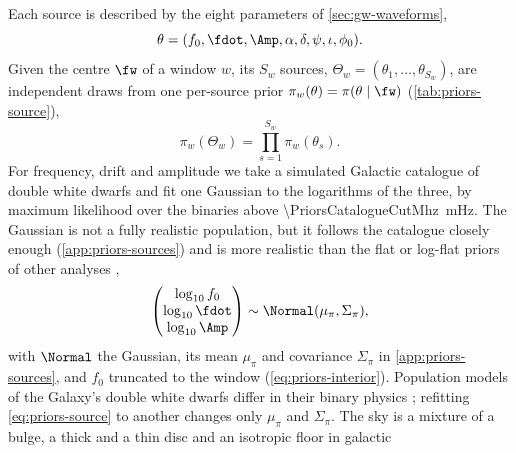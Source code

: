 Each source is described by the eight parameters of \cref{sec:gw-waveforms},
\begin{equation}
  \theta = (f_0,\fdot,\Amp,\alpha,\delta,\psi,\iota,\phi_0).
  \label{eq:gw-parameters}
\end{equation}
Given the centre $\fw$ of a window $w$, its $S_w$ sources, $\Theta_w = (\theta_1,\dots,\theta_{S_w})$,
are independent draws from one per-source prior $\pi_w(\theta) = \pi(\theta\mid\fw)$
(\cref{tab:priors-source}),
\begin{equation}
  \pi_w(\Theta_w) = \prod_{s=1}^{S_w}\pi_w(\theta_s).
  \label{eq:priors-window-prior}
\end{equation}
For frequency, drift and amplitude we take a simulated Galactic catalogue of double white dwarfs
\citep{perego2025towards,breivik2020cosmic} and fit one Gaussian to the logarithms of the three,
by maximum likelihood over the binaries above \qty{\PriorsCatalogueCutMhz}{\milli\hertz}. The
Gaussian is not a fully realistic population, but it follows the catalogue closely enough
(\cref{app:priors-sources}) and is more realistic than the flat or log-flat priors of other analyses
\citep{strub2022bayesian,deng2025modular,delmond2026neural},
\begin{equation}
  \begin{pmatrix}\log_{10}f_0\\ \log_{10}\fdot\\ \log_{10}\Amp\end{pmatrix}
  \sim \Normal(\mu_\pi, \Sigma_\pi),
  \label{eq:priors-source}
\end{equation}
with $\Normal$ the Gaussian, its mean $\mu_\pi$ and covariance $\Sigma_\pi$ in
\cref{app:priors-sources}, and $f_0$ truncated to the window
(\cref{eq:priors-interior}). Population models of the Galaxy's double white dwarfs
\citep{nelemans2001gravitational,toonen2012supernova,korol2017prospects,korol2020populations,georgousi2022gravitational,thiele2023applying}
differ in their binary physics
\citep{biscoveanu2023probing,toubiana2024interacting,boileau2025gravitational,delfavero2025recovering};
refitting \cref{eq:priors-source} to another changes only $\mu_\pi$ and $\Sigma_\pi$.
The sky is a mixture of a bulge, a thick and a thin disc and an isotropic floor in galactic
